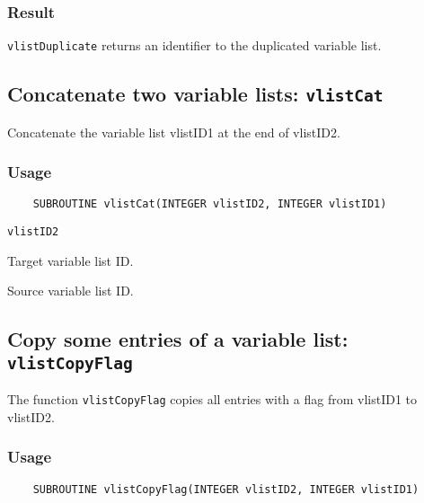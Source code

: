 \subsubsection*{Result}

{\tt vlistDuplicate} returns an identifier to the duplicated variable list.



\subsection{Concatenate two variable lists: {\tt vlistCat}}
\label{vlistCat}

Concatenate the variable list vlistID1 at the end of vlistID2.

\subsubsection*{Usage}

\begin{verbatim}
    SUBROUTINE vlistCat(INTEGER vlistID2, INTEGER vlistID1)
\end{verbatim}

\hspace*{4mm}\begin{minipage}[]{15cm}
\begin{deflist}{\tt vlistID2\ }
\item[{\tt vlistID2}]
Target variable list ID.
\item[{\tt vlistID1}]
Source variable list ID.

\end{deflist}
\end{minipage}


\subsection{Copy some entries of a variable list: {\tt vlistCopyFlag}}
\label{vlistCopyFlag}

The function {\tt vlistCopyFlag} copies all entries with a flag from vlistID1 to vlistID2.

\subsubsection*{Usage}

\begin{verbatim}
    SUBROUTINE vlistCopyFlag(INTEGER vlistID2, INTEGER vlistID1)
\end{verbatim}


